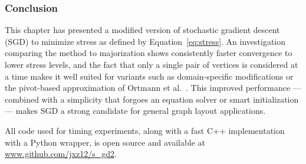 \subsubsection{Conclusion}
This chapter has presented a modified version of stochastic gradient descent (SGD) to minimize stress as defined by Equation~\eqref{eq:stress}. An investigation comparing the method to majorization shows consistently faster convergence to lower stress levels, and the fact that only a single pair of vertices is considered at a time makes it well suited for variants such as domain-specific modifications or the pivot-based approximation of Ortmann et al.\ \cite{Ortmann2017}.
This improved performance --- combined with a simplicity that forgoes an equation solver or smart initialization --- makes
SGD a strong candidate for general graph layout applications.

All code used for timing experiments, along with a fast C++ implementation with a Python wrapper, is open source and available at \url{www.github.com/jxz12/s_gd2}.